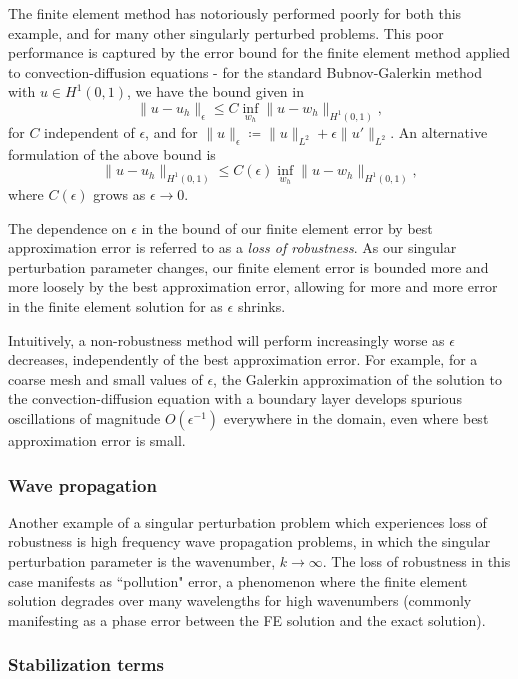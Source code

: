 \documentclass[11pt,onecolumn]{scrartcl}
\begin{document}
The finite element method has notoriously performed poorly for both this example, and for many other singularly perturbed problems. This poor performance is captured by the error bound for the finite element method applied to convection-diffusion equations - for the standard Bubnov-Galerkin method with $u\in H^1(0,1)$, we have the bound given in \cite{roos2008robust}
\[
\|u-u_h\|_\epsilon \leq C \inf_{w_h}\|u-w_h\|_{H^1(0,1)},
\]
for $C$ independent of $\epsilon$, and for $\|u\|_\epsilon \coloneqq \|u\|_{L^2} + \epsilon \|u'\|_{L^2}$. An alternative formulation of the above bound is 
\[
\|u-u_h\|_{H^1(0,1)} \leq C(\epsilon) \inf_{w_h}\|u-w_h\|_{H^1(0,1)},
\]
where $C(\epsilon)$ grows as $\epsilon\rightarrow 0$. 

The dependence on $\epsilon$ in the bound of our finite element error by best approximation error is referred to as a \textit{loss of robustness}.  As our singular perturbation parameter changes, our finite element error is bounded more and more loosely by the best approximation error, allowing for more and more error in the finite element solution for as $\epsilon$ shrinks. 

Intuitively, a non-robustness method will perform increasingly worse as $\epsilon$ decreases, independently of the best approximation error. For example, for a coarse mesh and small values of $\epsilon$, the Galerkin approximation of the solution to the convection-diffusion equation with a boundary layer develops spurious oscillations of magnitude $O(\epsilon^{-1})$ everywhere in the domain, even where best approximation error is small.  

\subsubsection{Wave propagation}

Another example of a singular perturbation problem which experiences loss of robustness is high frequency wave propagation problems, in which the singular perturbation parameter is the wavenumber, $k\rightarrow \infty$. The loss of robustness in this case manifests as ``pollution" error, a phenomenon where the finite element solution degrades over many wavelengths for high wavenumbers (commonly manifesting as a phase error between the FE solution and the exact solution).  

\subsubsection{Stabilization terms}
\end{document}
